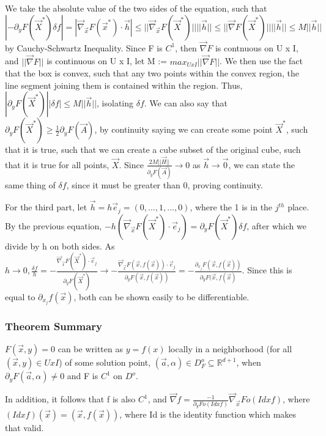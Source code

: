 \documentclass[11 pt, twoside]{article}
\begin{document}
We take the absolute value of the two sides of the equation, such that $|-\partial_yF(\vec{X}^*)\delta f| = |\vec{\nabla}_\vec{x}F(\vec{x}^*) \cdot \vec{h}| \leq ||\vec{\nabla}_\vec{x}F(\vec{X}^*)||||\vec{h}|| \leq ||\vec{\nabla}F(\vec{X}^*)||||\vec{h}|| \leq M||\vec{h}||$ by Cauchy-Schwartz Inequality. Since F is $C^1$, then $\vec{\nabla}F$ is contnuous on U x I, and $||\vec{\nabla}F||$ is continuous on U x I, let M := $max_{UxI}||\vec{\nabla}F||$. We then use the fact that the box is convex, such that any two points within the convex region, the line segment joining them is contained within the region. Thus, $|\partial_yF(\vec{X}^*)||\delta f| \leq M||\vec{h}||$, isolating $\delta f$. We can also say that $\partial_y F(\vec{X}^*) \geq \frac{1}{2}\partial_yF(\vec{A})$, by continuity saying we can create some point $\vec{X}^*$, such that it is true, such that we can create a cube subset of the original cube, such that it is true for all points, $\vec{X}$. Since $\frac{2M||\vec{H}||}{\partial_yF(\vec{A})} \to 0$ as $\vec{h} \to \vec{0}$, we can state the same thing of $\delta f$, since it must be greater than 0, proving continuity.

For the third part, let $\vec{h} = h\vec{e}_j = (0, ..., 1, ..., 0)$, where the 1 is in the $j^{th}$ place. By the previous equation, $-h(\vec{\nabla}_\vec{x}F(\vec{X}^*) \cdot \vec{e}_j) = \partial_yF(\vec{X}^*)\delta f$, after which we divide by h on both sides. As $h \to 0, \frac{\delta f}{h} = -\frac{\vec{\nabla}_\vec{x}F(\vec{X}^*) \cdot \vec{e}_j}{\partial_y F(\vec{X}^*)} \to -\frac{\vec{\nabla}_\vec{x}F(\vec{x}, f(\vec{x})) \cdot \vec{e}_j}{\partial_yF(\vec{x}, f(\vec{x}))} = -\frac{\partial_{x_j}F(\vec{x}, f(\vec{x}))}{\partial_yF(\vec{x}, f(\vec{x})}.$ Since this is equal to $\partial_{x_j}f(\vec{x})$, both can be shown easily to be differentiable.

\subsubsection{Theorem Summary}
$F(\vec{x}, y) = 0$ can be written as $y = f(x)$ locally in a neighborhood (for all $(\vec{x}, y) \in U x I$) of some solution point, $(\vec{a}, \alpha) \in D_F^o \subseteq \mathbb{R}^{d+1}$, when $\partial_yF(\vec{a}, \alpha) \neq 0$ and F is $C^1$ on $D^o$.

In addition, it follows that f is also $C^1$, and $\vec{\nabla}f = \frac{-1}{\partial_yF o (Id x f)}\vec{\nabla}_\vec{x}F o (Id x f)$, where $(Id x f)(\vec{x}) = (\vec{x}, f(\vec{x}))$, where Id is the identity function which makes that valid.
\end{document}

